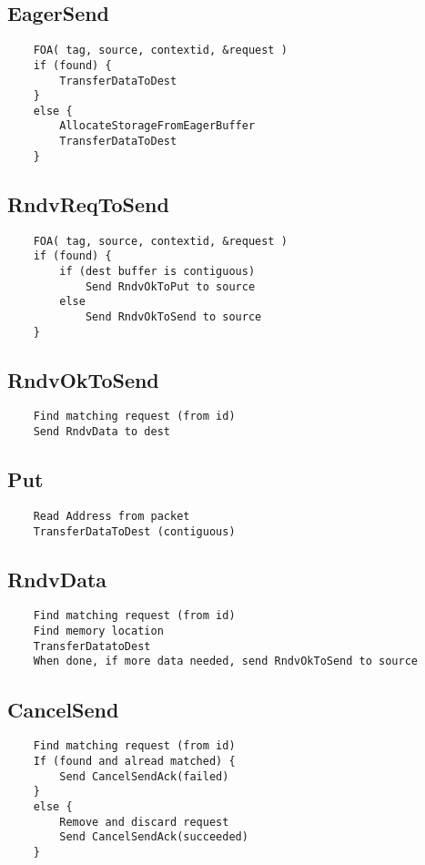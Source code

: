 \documentclass{article}
\begin{document}
\subsection{EagerSend}
\begin{verbatim}
    FOA( tag, source, contextid, &request )
    if (found) {
        TransferDataToDest
    }
    else {
        AllocateStorageFromEagerBuffer
        TransferDataToDest
    }
\end{verbatim}

\subsection{RndvReqToSend}
\begin{verbatim}
    FOA( tag, source, contextid, &request )
    if (found) {
        if (dest buffer is contiguous)
            Send RndvOkToPut to source
        else
            Send RndvOkToSend to source
    }
\end{verbatim}

\subsection{RndvOkToSend}
\begin{verbatim}
    Find matching request (from id)
    Send RndvData to dest
\end{verbatim}

\subsection{Put}
\begin{verbatim}
    Read Address from packet
    TransferDataToDest (contiguous)
\end{verbatim}

\subsection{RndvData}
\begin{verbatim}
    Find matching request (from id)
    Find memory location
    TransferDatatoDest
    When done, if more data needed, send RndvOkToSend to source
\end{verbatim}

\subsection{CancelSend}
\begin{verbatim}
    Find matching request (from id)
    If (found and alread matched) {
        Send CancelSendAck(failed)
    }
    else {
        Remove and discard request
        Send CancelSendAck(succeeded)
    }
 \end{verbatim}
\end{document}
